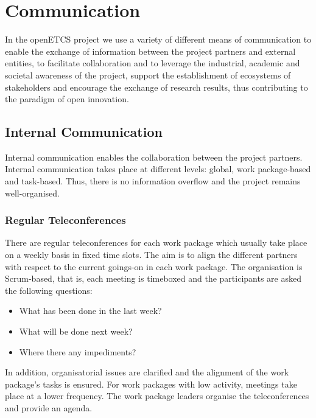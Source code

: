 ﻿%
\section{Communication}\label{sct:communication}
In the openETCS project we use a variety of different means of communication to enable the exchange of information between the project partners and external entities, to facilitate collaboration and to leverage the industrial, academic and societal awareness of the project, support the establishment of ecosystems of stakeholders and encourage the exchange of research results, thus contributing to the paradigm of open innovation.

\subsection{Internal Communication}

Internal communication enables the collaboration between the project partners. Internal communication takes place at different levels: global, work package-based and task-based. Thus, there is no information overflow and the project remains well-organised.

\subsubsection{Regular Teleconferences}

There are regular teleconferences for each work package which usually take place on a weekly basis in fixed time slots. The aim is to align the different partners with respect to the current goings-on in each work package. The organisation is Scrum-based, that is, each meeting is timeboxed and the participants are asked the following questions:
\begin{itemize}
\item What has been done in the last week?
\item What will be done next week?
\item Where there any impediments?
\end{itemize}

In addition, organisatorial issues are clarified and the alignment of the work package's tasks is ensured. For work packages with low activity, meetings take place at a lower frequency. The work package leaders organise the teleconferences and provide an agenda.

